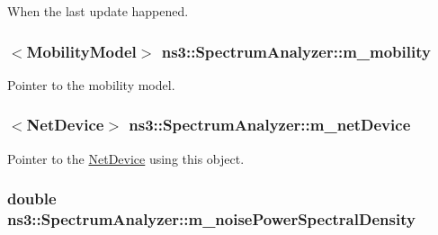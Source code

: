 When the last update happened. 

\subsubsection[{\texorpdfstring{m\+\_\+mobility}{m_mobility}}]{$<${\bf Mobility\+Model}$>$ ns3\+::\+Spectrum\+Analyzer\+::m\+\_\+mobility\hspace{0.3cm}{\ttfamily [private]}}\hypertarget{classns3_1_1SpectrumAnalyzer_ae74919a6bbdb2396127ac4729e89dfbb}{}\label{classns3_1_1SpectrumAnalyzer_ae74919a6bbdb2396127ac4729e89dfbb}


Pointer to the mobility model. 

\subsubsection[{\texorpdfstring{m\+\_\+net\+Device}{m_netDevice}}]{$<${\bf Net\+Device}$>$ ns3\+::\+Spectrum\+Analyzer\+::m\+\_\+net\+Device\hspace{0.3cm}{\ttfamily [private]}}\hypertarget{classns3_1_1SpectrumAnalyzer_afdc437a3c7dec8e0a64b3e77ba199938}{}\label{classns3_1_1SpectrumAnalyzer_afdc437a3c7dec8e0a64b3e77ba199938}


Pointer to the \hyperlink{classns3_1_1NetDevice}{Net\+Device} using this object. 

\subsubsection[{\texorpdfstring{m\+\_\+noise\+Power\+Spectral\+Density}{m_noisePowerSpectralDensity}}]{\setlength{\rightskip}{0pt plus 5cm}double ns3\+::\+Spectrum\+Analyzer\+::m\+\_\+noise\+Power\+Spectral\+Density\hspace{0.3cm}{\ttfamily [private]}}\hypertarget{classns3_1_1SpectrumAnalyzer_a152e578c6c71cbeb028868a6b13eeec8}{}\label{classns3_1_1SpectrumAnalyzer_a152e578c6c71cbeb028868a6b13eeec8}


